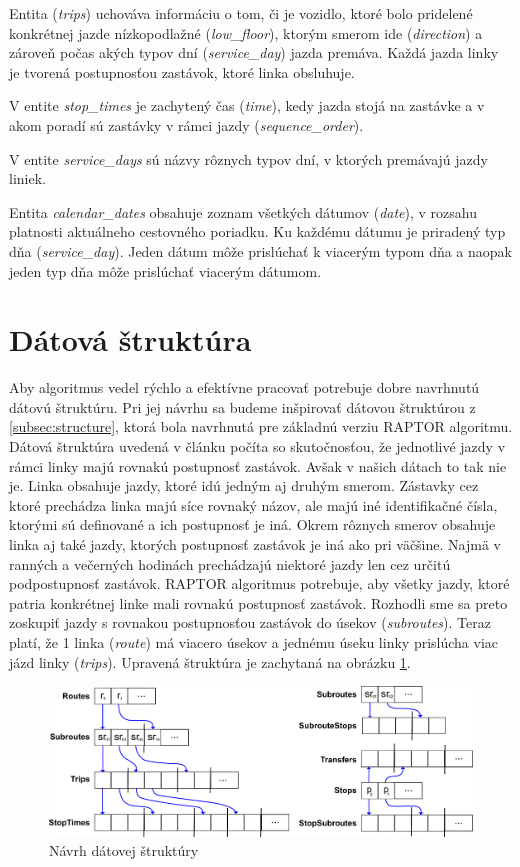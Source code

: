 Entita (\textit{trips}) uchováva informáciu o tom, či je vozidlo, ktoré bolo pridelené konkrétnej jazde nízkopodlažné (\textit{low\_floor}), ktorým smerom ide (\textit{direction}) a zároveň počas akých typov dní (\textit{service\_day}) jazda premáva. Každá jazda linky je tvorená postupnosťou zastávok, ktoré linka obsluhuje.

V entite \textit{stop\_times} je zachytený čas (\textit{time}), kedy jazda stojá na zastávke a v akom poradí sú zastávky v rámci jazdy (\textit{sequence\_order}).

V entite \textit{service\_days} sú názvy rôznych typov dní, v ktorých premávajú jazdy liniek. 

Entita \textit{calendar\_dates} obsahuje zoznam všetkých dátumov (\textit{date}), v rozsahu platnosti aktuálneho cestovného poriadku. Ku každému dátumu je priradený typ dňa (\textit{service\_day}). Jeden dátum môže prislúchať k viacerým typom dňa a naopak jeden typ dňa môže prislúchať viacerým dátumom.

\section{Dátová štruktúra}
Aby algoritmus vedel rýchlo a efektívne pracovať potrebuje dobre navrhnutú dátovú štruktúru. Pri jej návrhu sa budeme inšpirovať dátovou štruktúrou z \ref{subsec:structure}, ktorá bola navrhnutá pre základnú verziu RAPTOR algoritmu. Dátová štruktúra uvedená v článku počíta so skutočnosťou, že jednotlivé jazdy v rámci linky majú rovnakú postupnosť zastávok. Avšak v našich dátach to tak nie je. Linka obsahuje jazdy, ktoré idú jedným aj druhým smerom. Zástavky cez ktoré prechádza linka majú síce rovnaký názov, ale majú iné identifikačné čísla, ktorými sú definované a ich postupnosť je iná. Okrem rôznych smerov obsahuje linka aj také jazdy, ktorých postupnosť zastávok je iná ako pri väčšine. Najmä v ranných a večerných hodinách prechádzajú niektoré jazdy len cez určitú podpostupnosť zastávok. 
RAPTOR algoritmus potrebuje, aby všetky jazdy, ktoré patria konkrétnej linke mali rovnakú postupnosť zastávok. Rozhodli sme sa preto zoskupiť jazdy s rovnakou postupnosťou zastávok do úsekov (\textit{subroutes}). Teraz platí, že 1 linka (\textit{route}) má viacero úsekov a jednému úseku linky prislúcha viac jázd linky (\textit{trips}). Upravená štruktúra je zachytaná na obrázku \ref{fig:my-datastructure}.

\begin{figure}[H]
\centerline{\includegraphics[width=1.0\textwidth]{images/my-structure}}
\caption[Návrh dátovej štruktúry]{Návrh dátovej štruktúry}
\label{fig:my-datastructure}
\end{figure}

